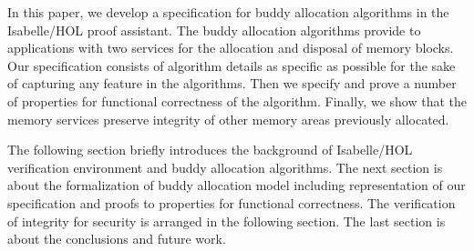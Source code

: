 In this paper, we develop a specification for buddy allocation algorithms in the Isabelle/HOL proof assistant. The buddy allocation algorithms provide to applications with two services for the allocation and disposal of memory blocks. Our specification consists of algorithm details as specific as possible for the sake of capturing any feature in the algorithms. Then we specify and prove a number of properties for functional correctness of the algorithm. Finally, we show that the memory services preserve integrity of other memory areas previously allocated.

The following section briefly introduces the background of Isabelle/HOL verification environment and buddy allocation algorithms. The next section is about the formalization of buddy allocation model including representation of our specification and proofs to properties for functional correctness. The verification of integrity for security is arranged in the following section. The last section is about the conclusions and future work.
